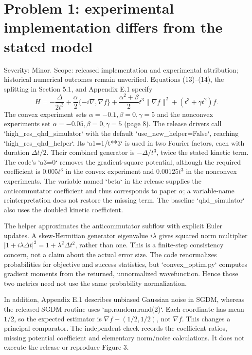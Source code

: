 \documentclass[10pt]{article}
\begin{document}
\section*{Problem 1: experimental implementation differs from the stated model}
Severity: Minor. Scope: released implementation and experimental attribution; historical numerical outcomes remain unverified. Equations (13)–(14), the splitting in Section 5.1, and Appendix E.1 specify \[H=-\frac{\Delta}{2t^3}+\frac{\alpha}{2}\{-i\nabla,\nabla f\}
   +\frac{\alpha^2+\beta}{2}t^3\|\nabla f\|^2+(t^3+\gamma t^2)f.\] The convex experiment sets \(\alpha=-0.1,\beta=0,\gamma=5\) and the nonconvex experiments set \(\alpha=-0.05,\beta=0,\gamma=5\) (page 8). The release drivers call `high\_res\_qhd\_simulator` with the default `use\_new\_helper=False`, reaching `high\_res\_qhd\_helper`. Its `a1=1/t**3` is used in two Fourier factors, each with duration \(\Delta t/2\). Their combined generator is \(-\Delta/t^3\), twice the stated kinetic term. The code’s `a3=0` removes the gradient-square potential, although the required coefficient is \(0.005t^3\) in the convex experiment and \(0.00125t^3\) in the nonconvex experiments. The variable named `beta` in the release supplies the anticommutator coefficient and thus corresponds to paper \(\alpha\); a variable-name reinterpretation does not restore the missing term. The baseline `qhd\_simulator` also uses the doubled kinetic coefficient.\par
The helper approximates the anticommutator subflow with explicit Euler updates. A skew-Hermitian generator eigenvalue \(i\lambda\) gives squared norm multiplier \(|1+i\lambda\Delta t|^2=1+\lambda^2\Delta t^2\), rather than one. This is a finite-step consistency concern, not a claim about the actual error size. The code renormalizes probabilities for objective and success statistics, but `convex\_optim.py` computes gradient moments from the returned, unnormalized wavefunction. Hence those two metrics need not use the same probability normalization.\par
In addition, Appendix E.1 describes unbiased Gaussian noise in SGDM, whereas the released SGDM routine uses `np.random.rand(2)`. Each coordinate has mean \(1/2\), so the expected estimator is \(\nabla f+(1/2,1/2)\), not \(\nabla f\). This changes a principal comparator. The independent check records the coefficient ratios, missing potential coefficient and elementary norm/noise calculations. It does not execute the release or reproduce Figure 3.\par
\end{document}
